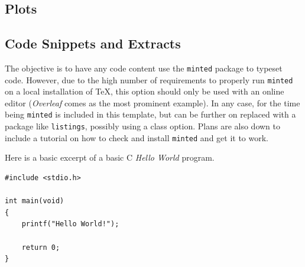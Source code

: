 \documentclass[palatino]{ist-report}
\newcommand*{\package}[1]{\texttt{#1}}
\begin{document}
\subsection{Plots}

\subsection{Code Snippets and Extracts}

The objective is to have any code content use the \package{minted} package to typeset code. However, due to the high number of requirements to properly run \package{minted} on a local installation of \TeX{}, this option should only be used with an online editor (\textit{Overleaf} comes as the most prominent example). In any case, for the time being \package{minted} is included in this template, but can be further on replaced with a package like \package{listings}, possibly using a class option. Plans are also down to include a tutorial on how to check and install \package{minted} and get it to work.

Here is a basic excerpt of a basic C \textit{Hello World} program.
\begin{verbatim}
#include <stdio.h>

int main(void)
{
    printf("Hello World!");
    
    return 0;
}
\end{verbatim}



\pagebreak

\printbibliography
\end{document}
